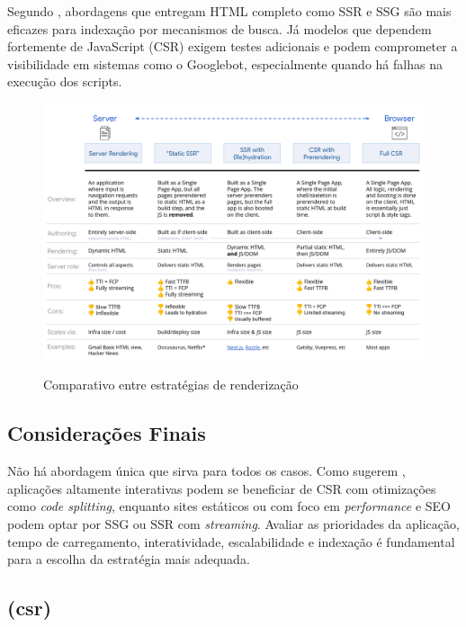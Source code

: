 Segundo , abordagens que entregam HTML completo como SSR e SSG são mais eficazes para indexação por mecanismos de busca. Já modelos que dependem fortemente de JavaScript (CSR) exigem testes adicionais e podem comprometer a visibilidade em sistemas como o Googlebot, especialmente quando há falhas na execução dos scripts.

\begin{figure}[H]
  \centering
  \caption{Comparativo entre estratégias de renderização}
  \includegraphics[width=\textwidth]{media/rendering_comparison_table.png}
  \label{fig:comparativo_renderizacao}
\end{figure}

\subsection*{Considerações Finais}

Não há abordagem única que sirva para todos os casos. Como sugerem , aplicações altamente interativas podem se beneficiar de CSR com otimizações como \textit{code splitting}, enquanto sites estáticos ou com foco em \textit{performance} e SEO podem optar por SSG ou SSR com \textit{streaming}. Avaliar as prioridades da aplicação, tempo de carregamento, interatividade, escalabilidade e indexação é fundamental para a escolha da estratégia mais adequada.










\subsection{ (\acrshort{csr})}
\label{subsec:csr}

